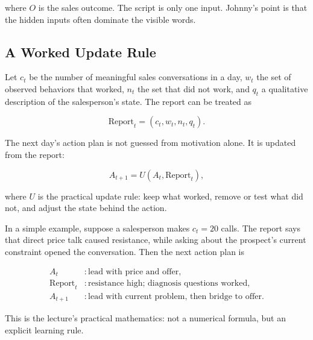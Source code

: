 where \(O\) is the sales outcome. The script is only one input. Johnny's point is that the hidden inputs often dominate the visible words.

\subsection{A Worked Update Rule}

Let \(c_t\) be the number of meaningful sales conversations in a day, \(w_t\) the set of observed behaviors that worked, \(n_t\) the set that did not work, and \(q_t\) a qualitative description of the salesperson's state. The report can be treated as

\begin{equation}
\text{Report}_t = (c_t,w_t,n_t,q_t).
\end{equation}

The next day's action plan is not guessed from motivation alone. It is updated from the report:

\begin{equation}
A_{t+1}
=
U(A_t,\text{Report}_t),
\end{equation}

where \(U\) is the practical update rule: keep what worked, remove or test what did not, and adjust the state behind the action.

In a simple example, suppose a salesperson makes \(c_t=20\) calls. The report says that direct price talk caused resistance, while asking about the prospect's current constraint opened the conversation. Then the next action plan is

\begin{align}
A_t &: \text{lead with price and offer},\\
\text{Report}_t &: \text{resistance high; diagnosis questions worked},\\
A_{t+1} &: \text{lead with current problem, then bridge to offer}.
\end{align}

This is the lecture's practical mathematics: not a numerical formula, but an explicit learning rule.

